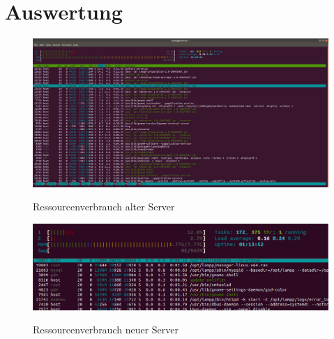 \section{Auswertung}
\begin{figure}[ht]
   \centering
     \includegraphics[width=15cm]{Bilder/server-ihatestau} \\
 \caption{Ressourcenverbrauch alter Server}
 \label{fig:ihatestau-res}
\end{figure}
\begin{figure}[ht]
   \centering
     \includegraphics[width=15cm]{Bilder/server-new} \\
 \caption{Ressourcenverbrauch neuer Server}
 \label{fig:ihatestau-res}
\end{figure}
